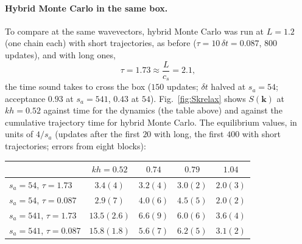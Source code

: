 \documentclass[11pt,aps,preprint,nofootinbib,superscriptaddress,tightenlines]{revtex4-2}
\def\st{\begin{equation}}
\def\stp{\end{equation}}
\def\Fig#1{Fig.~\ref{#1}}
\let\oldparagraph\paragraph
\renewcommand{\paragraph}{\par\bigskip\oldparagraph}
\begin{document}
\paragraph{Hybrid Monte Carlo in the same box.}  To compare at the same wavevectors, hybrid Monte Carlo was run at $L=1.2$
(one chain each) with short trajectories, as before ($\tau=10\,\delta t=0.087$, $800$ updates), and with long ones,
\st
\tau=1.73\approx\frac L{c_s}=2.1 ,
\stp
the time sound takes to cross the box ($150$ updates; $\delta t$ halved at $s_a=54$; acceptance $0.93$ at $s_a=541$, $0.43$ at $54$).
\Fig{fig:Skrelax} shows $S(\bm k)$ at $kh=0.52$ against time for the dynamics (the table above) and against the cumulative
trajectory time for hybrid Monte Carlo.  The equilibrium values, in units of $4/s_a$ (updates after the first $20$ with long, the
first $400$ with short trajectories; errors from eight blocks):
\begin{center}
\begin{tabular}{lcccc}
\hline
 & $kh=0.52$ & $0.74$ & $0.79$ & $1.04$ \\ \hline
$s_a=54$, $\tau=1.73$ & $3.4(4)$ & $3.2(4)$ & $3.0(2)$ & $2.0(3)$ \\
$s_a=54$, $\tau=0.087$ & $2.9(7)$ & $4.0(6)$ & $4.5(5)$ & $2.0(2)$ \\
$s_a=541$, $\tau=1.73$ & $13.5(2.6)$ & $6.6(9)$ & $6.0(6)$ & $3.6(4)$ \\
$s_a=541$, $\tau=0.087$ & $15.8(1.8)$ & $5.6(7)$ & $6.2(5)$ & $3.1(2)$ \\
\hline
\end{tabular}
\end{center}
\end{document}
